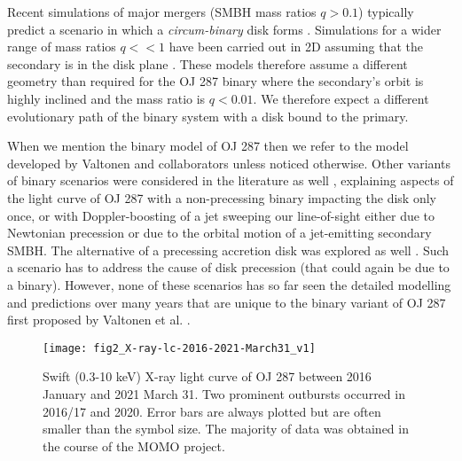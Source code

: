 \documentclass[preprints,article,accept,moreauthors,pdftex]{Definitions/mdpi}
\begin{document}
Recent simulations of major mergers (SMBH mass ratios $q > 0.1$) typically predict a scenario in which a {\em{circum-binary}} disk forms \citep{Liu2004, MacFadyen2008, Cuadra2009}. 
Simulations for a wider range of mass ratios $q<<1$ have been carried out in 2D assuming that the secondary is in the disk plane \citep[e.g.][]{Haiman2009, D'Orazio2016, Duffell2020}. 
These models therefore assume a different geometry than required for the OJ 287 binary where the secondary's orbit is highly inclined and the mass ratio is $q < 0.01$. We therefore expect a different evolutionary path of the binary system with a disk bound to the primary.

When we mention the binary model of OJ 287 then we refer to the model developed by Valtonen and collaborators \citep[e.g.][]{Sillanpaa1988, Sillanpaa1996, Valtonen1996, Lehto1996, Valtonen2008, Dey2018, Valtonen2019, Laine2020} unless noticed otherwise. Other variants of binary scenarios were considered in the literature as well \citep[e.g.][]{Katz1997, Villata1998, Valtaoja2000, Liu2002}, explaining aspects of the light curve of OJ 287 with a non-precessing binary impacting the disk only once,
or with Doppler-boosting of a jet sweeping our line-of-sight
either due to Newtonian precession or 
due to the orbital motion of a jet-emitting secondary SMBH.
The alternative of a precessing accretion disk was explored as well \citep{Britzen2018, Liska2018}. Such a scenario has to address the cause of disk precession (that could again be due to a binary). 
% 
However, none of these scenarios has so far seen the detailed modelling and predictions over many years that are unique to the binary variant of OJ 287 first proposed by Valtonen et al. \citep{Valtonen1996, Lehto1996}.   

\begin{figure}
\begin{center}
\texttt{[image: fig2\_X-ray-lc-2016-2021-March31\_v1]}
	\caption{Swift (0.3-10 keV) X-ray light curve of OJ 287 between 2016 January and 2021 March 31. Two prominent outbursts occurred in 2016/17 and 2020. Error bars are always plotted but are often smaller than the symbol size. The majority of data was obtained in the course of the MOMO project. 
     }
     \label{fig:Swift_Xlight-MOMO}
\end{center}
\end{figure}     
 
\end{document}
